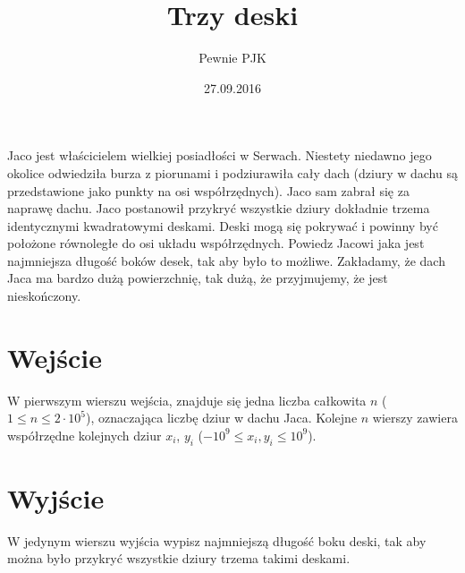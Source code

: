 \documentclass[zad,zawodnik,utf8]{sinol}
\title{Trzy deski}
\author{Pewnie PJK} %
\date{27.09.2016}
\begin{document}
\begin{tasktext}%
Jaco jest właścicielem wielkiej posiadłości w Serwach. Niestety niedawno jego okolice odwiedziła burza z
piorunami i podziurawiła cały dach (dziury w dachu są przedstawione jako punkty na osi współrzędnych).
Jaco sam zabrał się za naprawę dachu.
Jaco postanowił przykryć wszystkie dziury dokładnie trzema identycznymi kwadratowymi deskami. Deski
mogą się pokrywać i powinny być położone równoległe do osi układu współrzędnych. Powiedz Jacowi jaka jest
najmniejsza długość boków desek, tak aby było to możliwe.
Zakładamy, że dach Jaca ma bardzo dużą powierzchnię, tak dużą, że przyjmujemy, że jest nieskończony.
  \section{Wejście}
W pierwszym wierszu wejścia, znajduje się jedna liczba całkowita $n$ ($1 \leq n \leq 2 \cdot 10^5$), oznaczająca liczbę dziur
w dachu Jaca. Kolejne $n$ wierszy zawiera współrzędne kolejnych dziur $x_i$, $y_i$ ($-10^9 \leq x_i, y_i \leq 10^9$).

  \section{Wyjście}
W jedynym wierszu wyjścia wypisz najmniejszą długość boku deski, tak aby można było przykryć wszystkie
dziury trzema takimi deskami.

\makecompactexample

\end{tasktext}
\end{document}
